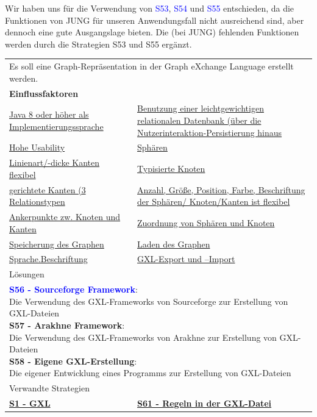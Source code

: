 \documentclass[enabledeprecatedfontcommands,fontsize=11pt,paper=a4,twoside]{scrartcl}
\newcounter{one}
\newcommand{\cb}[1]{{\textcolor{blue}{#1}}}
\begin{document}
\begin{onehalfspace}
	Wir haben uns für die Verwendung von \cb{S53}, \cb{S54} und \cb{S55} entschieden, da die Funktionen von JUNG für unseren Anwendungsfall nicht ausreichend sind, aber dennoch eine gute Ausgangslage bieten. Die (bei JUNG) fehlenden Funktionen werden durch die Strategien S53 und S55 ergänzt.
\end{onehalfspace}

\newpage
\begin{tabular} {|p{8cm} p{8cm}|}
	\hline
	\rowcolor{prob}\multicolumn{2}{|l|}{\parbox{16cm}{\textbf{22: GXL Erstellung}}} \\  \hline\hline 
	\multicolumn{2}{|l|}{\parbox{16cm}{Es soll eine Graph-Repräsentation in der Graph eXchange Language erstellt werden.}}\rule{0pt}{1ex}\\ \hline
	\multicolumn{2}{|l|}{\textbf{Einflussfaktoren}}\\
	\hyperlink{b}{Java 8 oder höher als Implementierungssprache}  & 
	\hyperlink {e}{Benutzung einer leichtgewichtigen relationalen Datenbank (über die Nutzerinteraktion-Persistierung hinaus}\\ 
	\hyperlink {g}{Hohe Usability}&
	\hyperlink {n}{Sphären} \\
	\hyperlink {o}{Linienart/-dicke Kanten flexibel}&
	\hyperlink {p}{Typisierte Knoten} \\
	\hyperlink {q}{gerichtete Kanten (3 Relationstypen} &
	\hyperlink {r}{Anzahl, Größe, Position, Farbe, Beschriftung der Sphären/ Knoten/Kanten ist flexibel} \\
	\hyperlink {s}{Ankerpunkte zw. Knoten und Kanten} &
	\hyperlink {t}{Zuordnung von Sphären und Knoten} \\
	\hyperlink {v}{Speicherung des Graphen} &
	\hyperlink {w}{Laden des Graphen} \\
	\hyperlink {hh}{Sprache.Beschriftung}&
	\hyperlink {jj}{GXL-Export und –Import}
	\\ \hline
	\multicolumn{2}{|l|}{Lösungen} \\
	\multicolumn{2}{|l|}{\parbox{16cm}{
			\textbf{\cb{\hypertarget{ttt}{S56 - Sourceforge Framework}}}: \\
			Die Verwendung des GXL-Frameworks von Sourceforge zur Erstellung von GXL-Dateien \\
			\textbf{S57 - Arakhne Framework}: \\
			Die Verwendung des GXL-Frameworks von Arakhne zur Erstellung von GXL-Dateien \\
			\textbf{S58 - Eigene GXL-Erstellung}: \\
			Die eigener Entwicklung eines Programms zur Erstellung von GXL-Dateien 
	} }\\ [6ex] \hline
	\multicolumn{2}{|l|}{Verwandte Strategien} \\
	\textbf{\hyperlink{yy}{S1 - GXL}}&
	\textbf{\hyperlink{vvv}{S61 - Regeln in der GXL-Datei}}
	\\\hline
\end{tabular}\\ \\ \\
\end{document}
